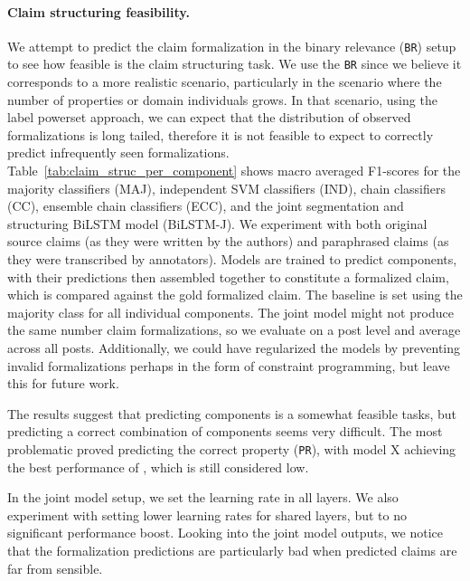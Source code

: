 \paragraph{Claim structuring feasibility. }
We attempt to predict the claim formalization in the binary
relevance (\texttt{BR}) setup to see how feasible is the claim 
structuring task. We use the \texttt{BR} since we believe it corresponds
to a more realistic scenario, particularly in the scenario where the number
of properties or domain individuals grows. In that scenario, using the
label powerset approach, we can expect that the
distribution of observed formalizations is long tailed, therefore it is not
feasible to expect to correctly predict infrequently seen formalizations.
Table~\ref{tab:claim_struc_per_component} shows macro averaged F1-scores for
the majority classifiers (MAJ), independent SVM classifiers (IND), chain
classifiers (CC), ensemble chain classifiers (ECC), and the joint segmentation
and structuring BiLSTM model (BiLSTM-J).  We experiment with both original
source claims (as they were written by the authors) and paraphrased claims (as
they were transcribed by annotators).
Models are trained to predict components, with their predictions then assembled
together to constitute a formalized claim, which is compared against the gold
formalized claim.  The baseline is set using the majority 
class for all individual components. 
The joint model might not produce the same number claim formalizations, 
so we evaluate on a post level and average across all posts. 
Additionally, we could have regularized the models by preventing invalid
formalizations perhaps in the form of constraint programming, but leave this
for future work. 

The results suggest that predicting components is a somewhat feasible tasks,
but predicting a correct combination of components seems very difficult.  The
most problematic proved predicting the correct property (\texttt{PR}), with
model X achieving the best performance of , which is still considered low. 

In the joint model setup, we set the learning rate in all layers. 
We also experiment with setting lower learning rates for shared layers,
but to no significant performance boost. 
Looking into the joint model outputs, we notice that the formalization predictions
are particularly bad when predicted claims are far from sensible. 

